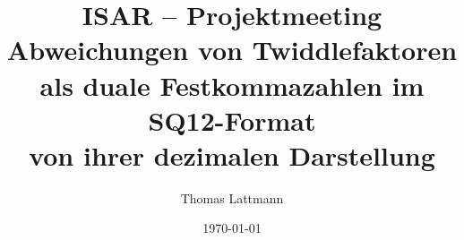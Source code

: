 
\title[Diskretisierungsfehler der Twiddlefaktoren]{\textbf{ISAR -- Projektmeeting}\\ 
\medskip Abweichungen von Twiddlefaktoren\\ als duale Festkommazahlen im SQ12-Format \\ von ihrer dezimalen Darstellung}  

\author[TL]{Thomas Lattmann}
\date[\today]{\today} 
\renewcommand*{\thesubfigure}{}
\newcommand{\vid}[2]{\movie[width=.9\textwidth,height=0.9\textheight,loop,showcontrols]{\texttt{[image: \#1]}}{#2}}
\newcommand{\mytitle}[1]{\begin{block}{}\begin{center}#1\end{center}\end{block}}
\newcommand{\figh}[2]{\begin{figure}\centering \texttt{[image: \#2]}\end{figure}}
\newcommand{\figw}[2]{\begin{figure}\centering \texttt{[image: \#2]}\end{figure}}
\newcommand{\fighw}[4]{\begin{figure}\centering\caption{#4} \texttt{[image: \#3]}\end{figure}}
\newcommand{\fig}[1]{\begin{figure}\centering \texttt{[image: \#1]}\end{figure}}
\newcommand{\bull}[1]{\begin{itemize}\item #1 \end{itemize}}
\usepackage{nameref} 
\newcommand{\cmk}{\textcolor{green}{\large\checkmark}}
\newcommand{\mtx}[1]{\ensuremath{\boldsymbol{{\mathrm{#1}}}}}
\newcommand*\colvec[3][]{\begin{pmatrix}\ifx\relax#1\relax\else#1\\\fi#2\\#3\end{pmatrix}}
\newcommand{\cols}[4]{ \begin{columns} \column[T]{#1\textwidth} #3 \column[T]{#2\textwidth} #4 \end{columns}}
\newcommand{\colss}[4]{ \begin{columns} \column{#1\textwidth} #3 \column{#2\textwidth} #4 \end{columns}}


